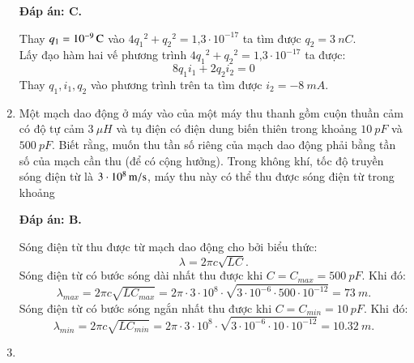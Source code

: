 \begin{enumerate}[label=\bfseries Câu \arabic*:]
	\hideall
	{		\textbf{Đáp án: C.}
		
		Thay $q_1 = \xsi{10^{-9}}{C}$ vào $4{q_1}^{2}+{q_2}^{2} = \text{1,3}\cdot10^{-17}$ ta tìm được $q_2 = \SI{3}{nC}$. \\
		Lấy đạo hàm hai vế phương trình $4{q_1}^{2}+{q_2}^{2} = \text{1,3}\cdot10^{-17}$ ta được:
		$$
		8{q_1}{i_1} + 2{q_2}{i_2} = 0
		$$
		Thay $q_1, i_1, q_2$ vào phương trình trên ta tìm được $i_2 = \SI{-8}{mA}.$
		
	}
	
	
	
	
	\item {}
	
	{Một mạch dao động ở máy vào của một máy thu thanh gồm cuộn thuần cảm có độ tự cảm $\SI{3}{\mu H}$ và tụ điện có điện dung biến thiên trong khoảng $\SI{10}{pF}$ và $\SI{500}{pF}$. Biết rằng, muốn thu tần số riêng của mạch dao động phải bằng tần số của mạch cần thu (để có cộng hưởng). Trong không khí, tốc độ truyền sóng điện từ là $\xsi{3\cdot10^{8}}{m/s}$, máy thu này có thể thu được sóng điện từ trong khoảng
	}
	
	\hideall
	{		\textbf{Đáp án: B.}
		
		Sóng điện từ thu được từ mạch dao động cho bởi biểu thức:
		$$
		\lambda = 2\pi c \sqrt{LC}.
		$$ 
		Sóng điện từ có bước sóng dài nhất thu được khi $C = C_{max} =\SI{500}{pF}$. Khi đó:
		$$
		\lambda_{max} = 2\pi c \sqrt{LC_{max}} = 2\pi \cdot 3\cdot10^{8} \cdot \sqrt{3\cdot10^{-6} \cdot 500\cdot10^{-12}} = \SI{73}{m}.
		$$
		Sóng điện từ có bước sóng ngắn nhất thu được khi $C = C_{min} =\SI{10}{pF}$. Khi đó:
		$$
		\lambda_{min} = 2\pi c \sqrt{LC_{min}} = 2\pi \cdot 3\cdot10^{8} \cdot \sqrt{3\cdot10^{-6} \cdot 10\cdot10^{-12}} = \SI{10,32}{m}.
		$$
		
	}
	
	\item {}
	

\end{enumerate}
